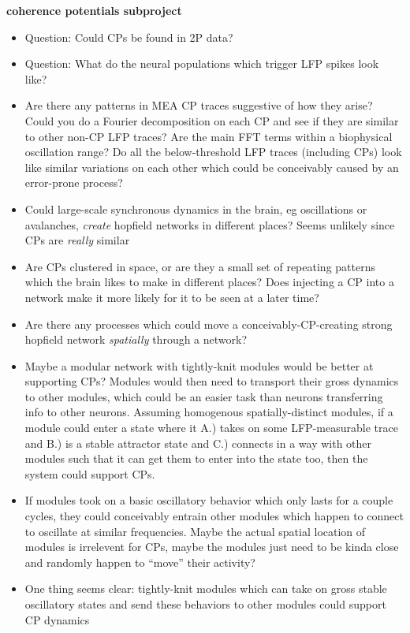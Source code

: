 \documentclass[a4paper, 12pt]{article}
\begin{document}
\textbf{coherence potentials subproject}
\begin{itemize}
\item Question: Could CPs be found in 2P data?
\item Question: What do the neural populations which trigger LFP spikes look like?
\item Are there any patterns in MEA CP traces suggestive of how they arise? Could you do a Fourier decomposition on each CP and see if they are similar to other non-CP LFP traces? Are the main FFT terms within a biophysical oscillation range? Do all the below-threshold LFP traces (including CPs) look like similar variations on each other which could be conceivably caused by an error-prone process?
\item Could large-scale synchronous dynamics in the brain, eg oscillations or avalanches, \textit{create} hopfield networks in different places? Seems unlikely since CPs are \textit{really} similar
\item Are CPs clustered in space, or are they a small set of repeating patterns which the brain likes to make in different places? Does injecting a CP into a network make it more likely for it to be seen at a later time?
\item Are there any processes which could move a conceivably-CP-creating strong hopfield network \textit{spatially} through a network?
\item Maybe a modular network with tightly-knit modules would be better at supporting CPs? Modules would then need to transport their gross dynamics to other modules, which could be an easier task than neurons transferring info to other neurons. Assuming homogenous spatially-distinct modules, if a module could enter a state where it A.) takes on some LFP-measurable trace and B.) is a stable attractor state and C.) connects in a way with other modules such that it can get them to enter into the state too, then the system could support CPs.
\item If modules took on a basic oscillatory behavior which only lasts for a couple cycles, they could conceivably entrain other modules which happen to connect to oscillate at similar frequencies. Maybe the actual spatial location of modules is irrelevent for CPs, maybe the modules just need to be kinda close and randomly happen to ``move'' their activity?
\item One thing seems clear: tightly-knit modules which can take on gross stable oscillatory states and send these behaviors to other modules could support CP dynamics

\end{itemize}
\end{document}

